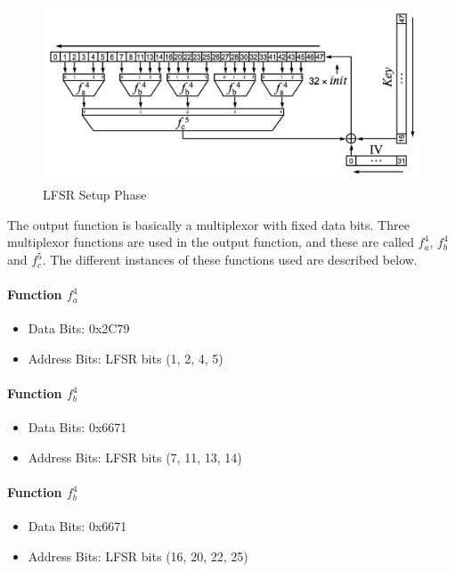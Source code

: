 \documentclass[11pt,a4paper]{article}
\begin{document}
\FloatBarrier
\begin{figure}[h]
	\centering
		\includegraphics[width=6in]{./hitag2-2.PNG}
	\caption{LFSR Setup Phase}	
	\label{fig:hitag2-2}
\end{figure}
\FloatBarrier

The output function is basically a multiplexor with fixed data bits. Three multiplexor functions are used in the output function, and these are called $f_a^4$, $f_b^4$ and $f_c^5$. The different instances of these functions used are described below.

\paragraph{Function $f_a^4$}
\begin{itemize}
\item Data Bits: 0x2C79
\item Address Bits: LFSR bits (1, 2, 4, 5)
\end{itemize}

\paragraph{Function $f_b^4$}
\begin{itemize}
\item Data Bits: 0x6671
\item Address Bits: LFSR bits (7, 11, 13, 14)
\end{itemize}

\paragraph{Function $f_b^4$}
\begin{itemize}
\item Data Bits: 0x6671
\item Address Bits: LFSR bits (16, 20, 22, 25)
\end{itemize}
\end{document}
